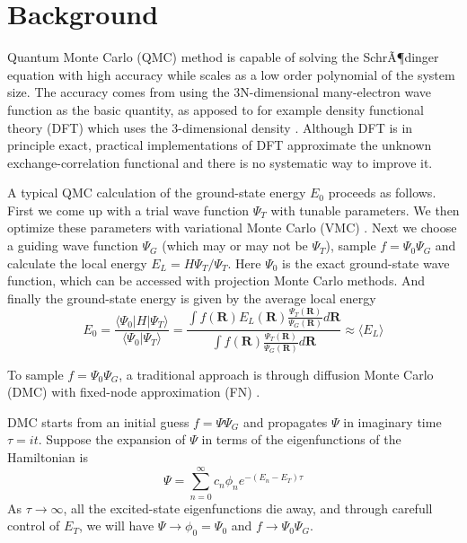 \documentclass[%
reprint,
nofootinbib,
amsmath,amssymb,
aps,
prl,
]{revtex4-1}
\begin{document}
\section{\label{sec:background}Background}
Quantum Monte Carlo (QMC) method is capable of solving the SchrÃ¶dinger equation with high accuracy while scales as a low order polynomial of the system size.
The accuracy comes from using the 3N-dimensional many-electron wave function as the basic quantity, as apposed to for example density functional theory (DFT) which uses the 3-dimensional density \cite{kohn1996density}.  Although DFT is in principle exact, practical implementations of DFT approximate the unknown exchange-correlation functional and there is no systematic way to improve it.

A typical QMC calculation of the ground-state energy $E_0$ proceeds as follows. First we come up with a trial wave function $\Psi_T$ with tunable parameters.
We then optimize these parameters with variational Monte Carlo (VMC) \cite{yokoyama1987variational}.
Next we choose a guiding wave function $\Psi_G$ (which may or may not be $\Psi_T$), sample $f = \Psi_0\Psi_G$ and calculate the local energy $E_L = H\Psi_T/\Psi_T$.
Here $\Psi_0$ is the exact ground-state wave function, which can be accessed with projection Monte Carlo methods.
And finally the ground-state energy is given by the average local energy
\begin{equation}
E_0 = \frac{\langle \Psi_0|H|\Psi_T \rangle}{\langle \Psi_0|\Psi_T \rangle}
= \frac{\int f(\mathbf{R})E_L(\mathbf{R})\frac{\Psi_T(\mathbf{R})}{\Psi_G(\mathbf{R})}d\mathbf{R}}{\int f(\mathbf{R})\frac{\Psi_T(\mathbf{R})}{\Psi_G(\mathbf{R})}d\mathbf{R}} \approx \langle E_L \rangle
\end{equation}

To sample $f = \Psi_0\Psi_G$, a traditional approach is through diffusion Monte Carlo (DMC) with fixed-node approximation (FN) \cite{reynolds1982fixed,foulkes2001quantum}.

DMC starts from an initial guess $f = \Psi\Psi_G$ and propagates $\Psi$ in imaginary time $\tau=it$.
Suppose the expansion of $\Psi$ in terms of the eigenfunctions of the Hamiltonian is
\begin{equation}
\Psi = \sum_{n=0}^{\infty}c_n\phi_ne^{-(E_n-E_T)\tau}
\end{equation}
As $\tau\to\infty$, all the excited-state eigenfunctions die away, and through carefull control of $E_T$, we will have $\Psi\to\phi_0=\Psi_0$ and $f\to\Psi_0\Psi_G$.
\end{document}
